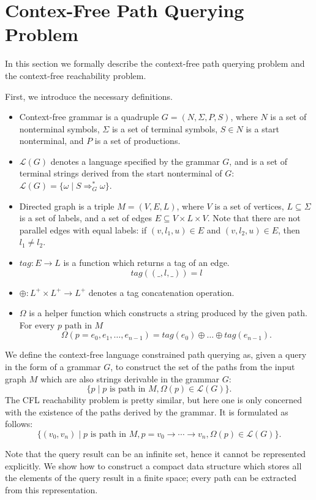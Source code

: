 \section{Contex-Free Path Querying Problem}
\label{sec:CFPQ}

In this section we formally describe the context-free path querying problem and the context-free reachability problem.

First, we introduce the necessary definitions.
\begin{itemize}
  \item Context-free grammar is a quadruple $G=(N, \Sigma, P, S)$, where $N$ is a set of nonterminal symbols, $\Sigma$ is a set of terminal symbols, $S \in N$ is a start nonterminal, and $P$ is a set of productions.
  \item $\mathcal{L}(G)$ denotes a language specified by the grammar $G$, and is a set of terminal strings derived from the start nonterminal of $G$: $\mathcal{L}(G) = \{\omega \mid S \Rightarrow_{G}^{*} \omega\}$.
  \item Directed graph is a triple $M = (V,E,L)$, where $V$ is a set of vertices, $L \subseteq \Sigma$ is a set of labels, and a set of edges $E\subseteq V\times L\times V$.
  Note that there are not parallel edges with equal labels: if $(v, l_1, u) \in E$ and $(v,l_2,u) \in E$, then $l_1 \neq l_2$.
  \item $tag: E \rightarrow L$ is a function which returns a tag of an edge. $$tag((\_,l,\_)) = l$$
  \item $\oplus: L^+ \times L^+ \rightarrow L^+$ denotes a tag concatenation operation.
  \item $\Omega$ is a helper function which constructs a string produced by the given path. For every $p \text{ path in } M$
  $$ \Omega(p = e_{0},e_{1},\dots,e_{n-1}) = tag (e_{0}) \oplus \dots \oplus tag (e_{n-1}).$$
\end{itemize}

We define the context-free language constrained path querying as, given a query in the form of a grammar $G$, to construct the set of the paths from the input graph $M$ which are also strings derivable in the grammar $G$: $$\{p \mid p \text{ is path in } M, \Omega(p) \in \mathcal{L}(G)\}.$$
The CFL reachability problem is pretty similar, but here one is only concerned with the existence of the paths derived by the grammar. It is formulated as follows: $$\{ (v_0,v_n) \mid p \text{ is path in } M, p = v_0 \rightarrow \cdots \rightarrow v_n, \Omega(p) \in \mathcal{L}(G)\}.$$

Note that the query result can be an infinite set, hence it cannot be represented explicitly.
We show how to construct a compact data structure which stores all the elements of the query result in a finite space; every path can be extracted from this representation.